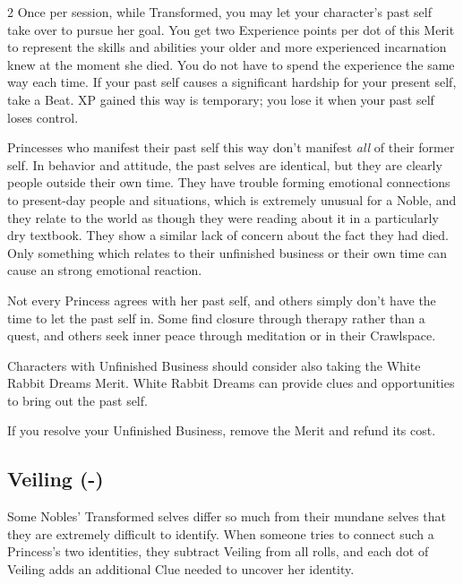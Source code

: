 \begin{multicols}{2}
Once per session, while Transformed, you may let your character's past self take over to pursue her goal. You get two Experience points per dot of this Merit to represent the skills and abilities your older and more experienced incarnation knew at the moment she died. You do not have to spend the experience the same way each time. If your past self causes a significant hardship for your present self, take a Beat. XP gained this way is temporary; you lose it when your past self loses control. 

Princesses who manifest their past self this way don't manifest \textit{all} of their former self. In behavior and attitude, the past selves are identical, but they are clearly people outside their own time. They have trouble forming emotional connections to present-day people and situations, which is extremely unusual for a Noble, and they relate to the world as though they were reading about it in a particularly dry textbook. They show a similar lack of concern about the fact they had died. Only something which relates to their unfinished business or their own time can cause an strong emotional reaction.

Not every Princess agrees with her past self, and others simply don't have the time to let the past self in. Some find closure through therapy rather than a quest, and others seek inner peace through meditation or in their Crawlspace.

Characters with Unfinished Business should consider also taking the White Rabbit Dreams Merit. White Rabbit Dreams can provide clues and opportunities to bring out the past self. 

If you resolve your Unfinished Business, remove the Merit and refund its cost. 

\subsection*{Veiling (\textbullet\nobreak\hspace{.16667em}-\nobreak\hspace{.16667em}\textbullet\textbullet\textbullet)}

Some Nobles' Transformed selves differ so much from their mundane selves that they are extremely difficult to identify. When someone tries to connect such a Princess's two identities, they subtract Veiling from all rolls, and each dot of Veiling adds an additional Clue needed to uncover her identity. 


\end{multicols}
